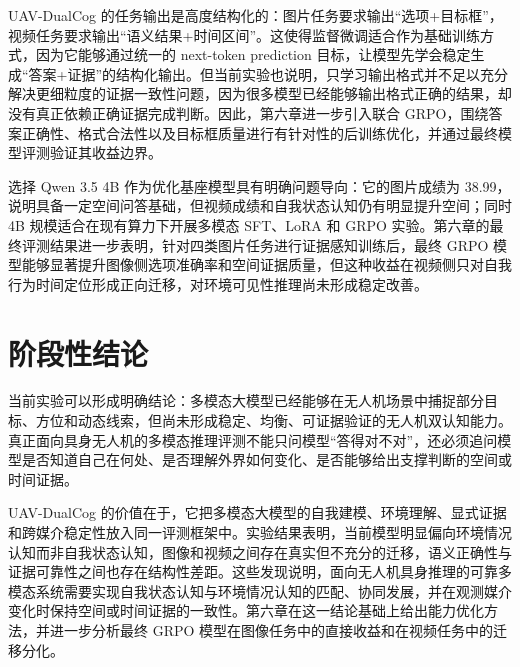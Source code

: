 UAV-DualCog 的任务输出是高度结构化的：图片任务要求输出“选项+目标框”，视频任务要求输出“语义结果+时间区间”。这使得监督微调适合作为基础训练方式，因为它能够通过统一的 next-token prediction 目标，让模型先学会稳定生成“答案+证据”的结构化输出。但当前实验也说明，只学习输出格式并不足以充分解决更细粒度的证据一致性问题，因为很多模型已经能够输出格式正确的结果，却没有真正依赖正确证据完成判断。因此，第六章进一步引入联合 GRPO，围绕答案正确性、格式合法性以及目标框质量进行有针对性的后训练优化，并通过最终模型评测验证其收益边界。

选择 Qwen 3.5 4B 作为优化基座模型具有明确问题导向：它的图片成绩为 38.99，说明具备一定空间问答基础，但视频成绩和自我状态认知仍有明显提升空间；同时 4B 规模适合在现有算力下开展多模态 SFT、LoRA 和 GRPO 实验。第六章的最终评测结果进一步表明，针对四类图片任务进行证据感知训练后，最终 GRPO 模型能够显著提升图像侧选项准确率和空间证据质量，但这种收益在视频侧只对自我行为时间定位形成正向迁移，对环境可见性推理尚未形成稳定改善。

\section{阶段性结论}

当前实验可以形成明确结论：多模态大模型已经能够在无人机场景中捕捉部分目标、方位和动态线索，但尚未形成稳定、均衡、可证据验证的无人机双认知能力。真正面向具身无人机的多模态推理评测不能只问模型“答得对不对”，还必须追问模型是否知道自己在何处、是否理解外界如何变化、是否能够给出支撑判断的空间或时间证据。

UAV-DualCog 的价值在于，它把多模态大模型的自我建模、环境理解、显式证据和跨媒介稳定性放入同一评测框架中。实验结果表明，当前模型明显偏向环境情况认知而非自我状态认知，图像和视频之间存在真实但不充分的迁移，语义正确性与证据可靠性之间也存在结构性差距。这些发现说明，面向无人机具身推理的可靠多模态系统需要实现自我状态认知与环境情况认知的匹配、协同发展，并在观测媒介变化时保持空间或时间证据的一致性。第六章在这一结论基础上给出能力优化方法，并进一步分析最终 GRPO 模型在图像任务中的直接收益和在视频任务中的迁移分化。
